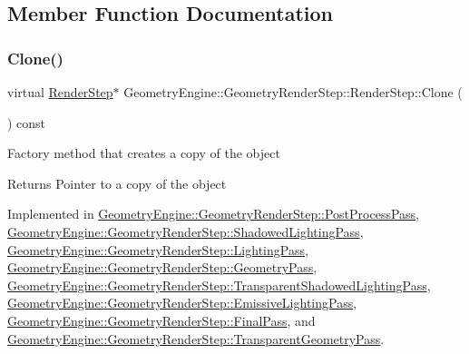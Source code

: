 \subsection{Member Function Documentation}
\mbox{\label{class_geometry_engine_1_1_geometry_render_step_1_1_render_step_afe33ea9d82c5be11f55af7d39691d44b}} 
\subsubsection{\texorpdfstring{Clone()}{Clone()}}
{\footnotesize\ttfamily virtual \mbox{\hyperlink{class_geometry_engine_1_1_geometry_render_step_1_1_render_step}{Render\+Step}}$\ast$ Geometry\+Engine\+::\+Geometry\+Render\+Step\+::\+Render\+Step\+::\+Clone (\begin{DoxyParamCaption}{ }\end{DoxyParamCaption}) const\hspace{0.3cm}{\ttfamily [pure virtual]}}

Factory method that creates a copy of the object \begin{DoxyReturn}{Returns}
Pointer to a copy of the object 
\end{DoxyReturn}


Implemented in \mbox{\hyperlink{class_geometry_engine_1_1_geometry_render_step_1_1_post_process_pass_afcf20dc0a20cf1e0fb730c7b56071c26}{Geometry\+Engine\+::\+Geometry\+Render\+Step\+::\+Post\+Process\+Pass}}, \mbox{\hyperlink{class_geometry_engine_1_1_geometry_render_step_1_1_shadowed_lighting_pass_a73176d6860aee0903034eeaf93edb40d}{Geometry\+Engine\+::\+Geometry\+Render\+Step\+::\+Shadowed\+Lighting\+Pass}}, \mbox{\hyperlink{class_geometry_engine_1_1_geometry_render_step_1_1_lighting_pass_a4f1cb36c7bf6a90d0aa3b8e8feba5e5e}{Geometry\+Engine\+::\+Geometry\+Render\+Step\+::\+Lighting\+Pass}}, \mbox{\hyperlink{class_geometry_engine_1_1_geometry_render_step_1_1_geometry_pass_a12e85a0169cb7b92cb8bd7b7fe100b33}{Geometry\+Engine\+::\+Geometry\+Render\+Step\+::\+Geometry\+Pass}}, \mbox{\hyperlink{class_geometry_engine_1_1_geometry_render_step_1_1_transparent_shadowed_lighting_pass_a56d2ef131669ae3964a04cb54e6c3b0f}{Geometry\+Engine\+::\+Geometry\+Render\+Step\+::\+Transparent\+Shadowed\+Lighting\+Pass}}, \mbox{\hyperlink{class_geometry_engine_1_1_geometry_render_step_1_1_emissive_lighting_pass_a5a46d5e73fe672e09584a2e6e8bfa5e8}{Geometry\+Engine\+::\+Geometry\+Render\+Step\+::\+Emissive\+Lighting\+Pass}}, \mbox{\hyperlink{class_geometry_engine_1_1_geometry_render_step_1_1_final_pass_a6633ed9c32944cc390d2b0ab32225845}{Geometry\+Engine\+::\+Geometry\+Render\+Step\+::\+Final\+Pass}}, and \mbox{\hyperlink{class_geometry_engine_1_1_geometry_render_step_1_1_transparent_geometry_pass_a6bfc83f45b84112bbf1beda1ed8e5466}{Geometry\+Engine\+::\+Geometry\+Render\+Step\+::\+Transparent\+Geometry\+Pass}}.

